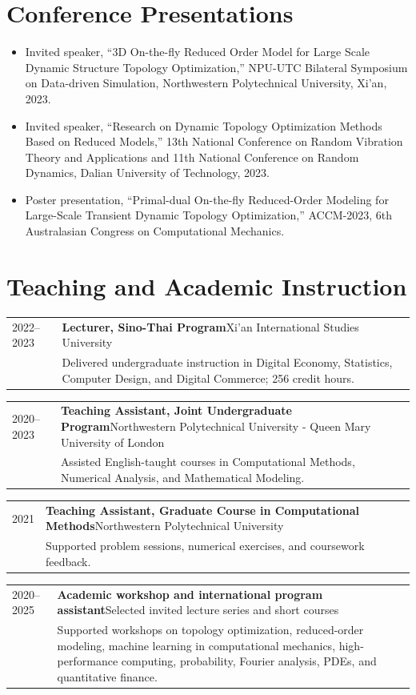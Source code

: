 \documentclass[8pt,a4paper]{extarticle}
\makeatletter
\newcommand{\cvitem}[4]{%
  \begin{tabularx}{\textwidth}{@{}p{1.85cm}X@{}}
    {\color{lightgray}\small #1} &
    \textbf{#2}{\color{lightgray}\small\quad #3}\\
    & {\color{textgray}\small #4}
  \end{tabularx}\vspace{0.1em}
}
\newcommand{\compactlist}{%
  \begin{itemize}[leftmargin=1em,itemsep=0.04em,topsep=0.05em]
}
\newcommand{\finishcompactlist}{\end{itemize}}
\makeatother
\begin{document}
\section{Conference Presentations}
\compactlist
  \item Invited speaker, ``3D On-the-fly Reduced Order Model for Large Scale Dynamic Structure Topology Optimization,'' NPU-UTC Bilateral Symposium on Data-driven Simulation, Northwestern Polytechnical University, Xi'an, 2023.
  \item Invited speaker, ``Research on Dynamic Topology Optimization Methods Based on Reduced Models,'' 13th National Conference on Random Vibration Theory and Applications and 11th National Conference on Random Dynamics, Dalian University of Technology, 2023.
  \item Poster presentation, ``Primal-dual On-the-fly Reduced-Order Modeling for Large-Scale Transient Dynamic Topology Optimization,'' ACCM-2023, 6th Australasian Congress on Computational Mechanics.
\finishcompactlist

\section{Teaching and Academic Instruction}
\cvitem{2022--2023}{Lecturer, Sino-Thai Program}{Xi'an International Studies University}{Delivered undergraduate instruction in Digital Economy, Statistics, Computer Design, and Digital Commerce; 256 credit hours.}
\cvitem{2020--2023}{Teaching Assistant, Joint Undergraduate Program}{Northwestern Polytechnical University - Queen Mary University of London}{Assisted English-taught courses in Computational Methods, Numerical Analysis, and Mathematical Modeling.}
\cvitem{2021}{Teaching Assistant, Graduate Course in Computational Methods}{Northwestern Polytechnical University}{Supported problem sessions, numerical exercises, and coursework feedback.}
\cvitem{2020--2025}{Academic workshop and international program assistant}{Selected invited lecture series and short courses}{Supported workshops on topology optimization, reduced-order modeling, machine learning in computational mechanics, high-performance computing, probability, Fourier analysis, PDEs, and quantitative finance.}
\end{document}

